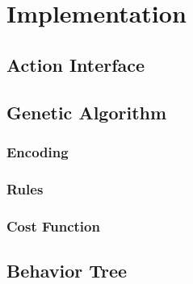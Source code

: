 \chapter{Implementation}
\section{Action Interface}
\label{implementation:action_interface}

\section{Genetic Algorithm}
\subsection{Encoding}
\subsection{Rules}
\subsection{Cost Function}

\section{Behavior Tree}
